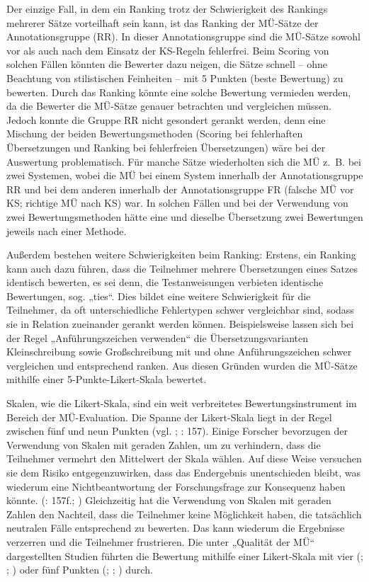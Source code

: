 Der einzige Fall, in dem ein Ranking trotz der Schwierigkeit des Rankings mehrerer Sätze vorteilhaft sein kann, ist das Ranking der MÜ-Sätze der Annotationsgruppe (RR). In dieser Annotationsgruppe sind die MÜ-Sätze sowohl vor als auch nach dem Einsatz der KS-Regeln fehlerfrei. Beim Scoring von solchen Fällen könnten die Bewerter dazu neigen, die Sätze schnell -- ohne Beachtung von stilistischen Feinheiten -- mit 5 Punkten (beste Bewertung) zu bewerten. Durch das Ranking könnte eine solche Bewertung vermieden werden, da die Bewerter die MÜ-Sätze genauer betrachten und vergleichen müssen. Jedoch konnte die Gruppe RR nicht gesondert gerankt werden, denn eine Mischung der beiden Bewertungsmethoden (Scoring bei fehlerhaften Übersetzungen und Ranking bei fehlerfreien Übersetzungen) wäre bei der Auswertung problematisch. Für manche Sätze wiederholten sich die MÜ z.~B. bei zwei Systemen, wobei die MÜ bei einem System innerhalb der Annotationsgruppe RR und bei dem anderen innerhalb der Annotationsgruppe FR (falsche MÜ vor KS; richtige MÜ nach KS) war. In solchen Fällen und bei der Verwendung von zwei Bewertungsmethoden hätte eine und dieselbe Übersetzung zwei Bewertungen jeweils nach einer Methode.

Außerdem bestehen weitere Schwierigkeiten beim Ranking: Erstens, ein Ranking kann auch dazu führen, dass die Teilnehmer mehrere Übersetzungen eines Satzes identisch bewerten, es sei denn, die Testanweisungen verbieten identische Bewertungen, sog. „ties“. Dies bildet eine weitere Schwierigkeit für die Teilnehmer, da oft unterschiedliche Fehlertypen schwer vergleichbar sind, sodass sie in Relation zueinander gerankt werden können. Beispielsweise lassen sich bei der Regel „Anführungszeichen verwenden“ die Übersetzungsvarianten Kleinschreibung sowie Großschreibung mit und ohne Anführungszeichen schwer vergleichen und entsprechend ranken. Aus diesen Gründen wurden die MÜ-Sätze mithilfe einer 5-Punkte-Likert-Skala bewertet.


Skalen, wie die Likert-Skala, sind ein weit verbreitetes Bewertungsinstrument im Bereich der MÜ-Evaluation. Die Spanne der Likert-Skala liegt in der Regel zwischen fünf und neun Punkten (vgl. \citealt{Porst2011}; \citealt{SaldanhaOBrien2014}: 157). Einige Forscher bevorzugen der Verwendung von Skalen mit geraden Zahlen, um zu verhindern, dass die Teilnehmer vermehrt den Mittelwert der Skala wählen. Auf diese Weise versuchen sie dem Risiko entgegenzuwirken, dass das Endergebnis unentschieden bleibt, was wiederum eine Nichtbeantwortung der Forschungsfrage zur Konsequenz haben könnte. (\citealt{SaldanhaOBrien2014}: 157f.; \citealt{Johnston2015}) Gleichzeitig hat die Verwendung von Skalen mit geraden Zahlen den Nachteil, dass die Teilnehmer keine Möglichkeit haben, die tatsächlich neutralen Fälle entsprechend zu bewerten. Das kann wiederum die Ergebnisse verzerren und die Teilnehmer frustrieren. \citep{Johnston2015} Die unter  „Qualität der MÜ“ dargestellten Studien führten die Bewertung mithilfe einer Likert-Skala mit vier (\citealt{VanSlype1979}; \citealt{VanniMiller2002}; \citealt{Coughlin2003}) oder fünf Punkten (\citealt{LDC2002}; \citealt{White2003}; \citealt{Hamon2007}) durch.

